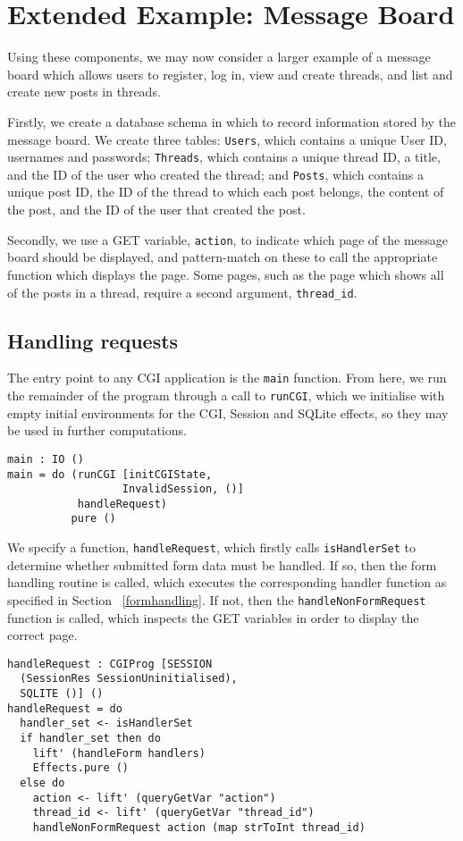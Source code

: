 \documentclass[preprint]{sigplanconf}
\begin{document}

\section{Extended Example: Message Board}
\label{messageboard}
Using these components, we may now consider a larger example of a message board which allows users to register, log in, view and create threads, and list and create new posts in threads. 

Firstly, we create a database schema in which to record information stored by the message board. We create three tables: \texttt{Users}, which contains a unique User ID, usernames and passwords; \texttt{Threads}, which contains a unique thread ID, a title, and the ID of the user who created the thread; and \texttt{Posts}, which contains a unique post ID, the ID of the thread to which each post belongs, the content of the post, and the ID of the user that created the post.

Secondly, we use a GET variable, \texttt{action}, to indicate which page of the message board should be displayed, and pattern-match on these to call the appropriate function which displays the page. Some pages, such as the page which shows all of the posts in a thread, require a second argument, \texttt{thread\_id}. 
\subsection{Handling requests}
The entry point to any CGI application is the \texttt{main} function. From here, we run the remainder of the program through a call to \texttt{runCGI}, which we initialise with empty initial environments for the CGI, Session and SQLite effects, so they may be used in further computations. 
\begin{Verbatim}
main : IO ()
main = do (runCGI [initCGIState, 
                  InvalidSession, ()] 
           handleRequest)
          pure ()
\end{Verbatim}
We specify a function, \texttt{handleRequest}, which firstly calls \texttt{isHandlerSet} to determine whether submitted form data must be handled. If so, then the form handling routine is called, which executes the corresponding handler function as specified in Section ~\ref{formhandling}. If not, then the \texttt{handleNonFormRequest} function is called, which inspects the GET variables in order to display the correct page.
\begin{Verbatim}
handleRequest : CGIProg [SESSION 
  (SessionRes SessionUninitialised), 
  SQLITE ()] ()
handleRequest = do 
  handler_set <- isHandlerSet
  if handler_set then do
    lift' (handleForm handlers)
    Effects.pure ()
  else do
    action <- lift' (queryGetVar "action")
    thread_id <- lift' (queryGetVar "thread_id")
    handleNonFormRequest action (map strToInt thread_id)
\end{Verbatim}
\end{document}

